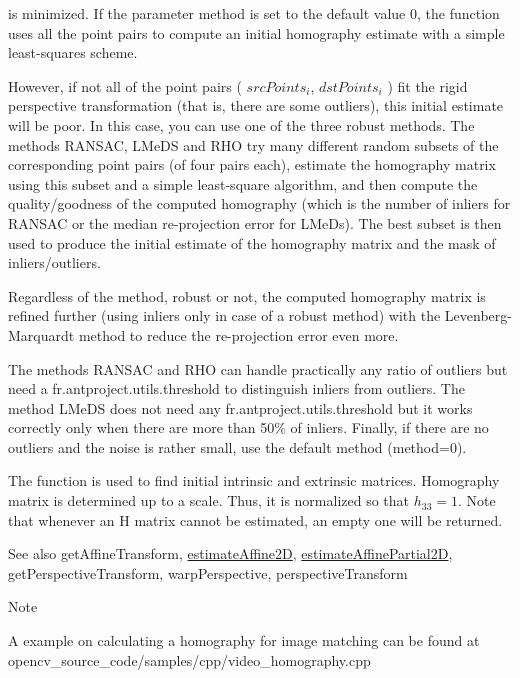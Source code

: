 is minimized. If the parameter method is set to the default value 0, the function uses all the point pairs to compute an initial homography estimate with a simple least-\/squares scheme. 

However, if not all of the point pairs ( $srcPoints_i$, $dstPoints_i$ ) fit the rigid perspective transformation (that is, there are some outliers), this initial estimate will be poor. In this case, you can use one of the three robust methods. The methods R\+A\+N\+S\+AC, L\+Me\+DS and R\+HO try many different random subsets of the corresponding point pairs (of four pairs each), estimate the homography matrix using this subset and a simple least-\/square algorithm, and then compute the quality/goodness of the computed homography (which is the number of inliers for R\+A\+N\+S\+AC or the median re-\/projection error for L\+Me\+Ds). The best subset is then used to produce the initial estimate of the homography matrix and the mask of inliers/outliers. 

Regardless of the method, robust or not, the computed homography matrix is refined further (using inliers only in case of a robust method) with the Levenberg-\/\+Marquardt method to reduce the re-\/projection error even more. 

The methods R\+A\+N\+S\+AC and R\+HO can handle practically any ratio of outliers but need a fr.antproject.utils.threshold to distinguish inliers from outliers. The method L\+Me\+DS does not need any fr.antproject.utils.threshold but it works correctly only when there are more than 50\% of inliers. Finally, if there are no outliers and the noise is rather small, use the default method (method=0).

The function is used to find initial intrinsic and extrinsic matrices. Homography matrix is determined up to a scale. Thus, it is normalized so that $h_{33}=1$. Note that whenever an H matrix cannot be estimated, an empty one will be returned. 

\begin{DoxySeeAlso}{See also}
get\+Affine\+Transform, \hyperlink{group__calib3d_ga3ac5c98614a2c26448c68e407388473f}{estimate\+Affine2D}, \hyperlink{group__calib3d_gab4e1d79cab0ae6448de411f9688836c8}{estimate\+Affine\+Partial2D}, get\+Perspective\+Transform, warp\+Perspective, perspective\+Transform 
\end{DoxySeeAlso}


\begin{DoxyNote}{Note}

\begin{DoxyItemize}
\item A example on calculating a homography for image matching can be found at opencv\+\_\+source\+\_\+code/samples/cpp/video\+\_\+homography.\+cpp 
\end{DoxyItemize}
\end{DoxyNote}
\mbox{\label{group__calib3d_ga7460fd1ec11b17261dc7b2208a1f2d9f}} 
